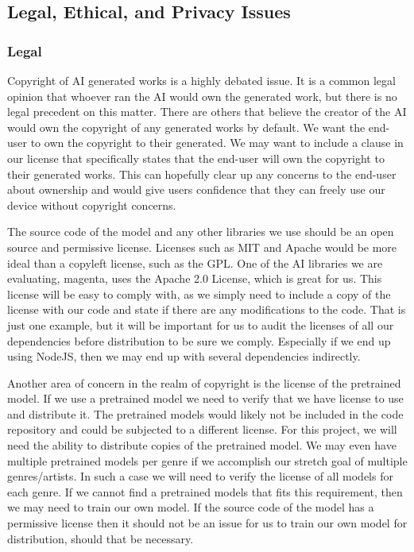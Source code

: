 \subsection{Legal, Ethical, and Privacy Issues}

\subsubsection{Legal}

Copyright of AI generated works is a highly debated issue. It is a common legal opinion
that whoever ran the AI would own the generated work, but there is no legal precedent on
this matter. There are others that believe the creator of the AI would own the copyright
of any generated works by default. We want the end-user to own the copyright to their
generated. We may want to include a clause in our license that specifically states that
the end-user will own the copyright to their generated works. This can hopefully clear up
any concerns to the end-user about ownership and would give users confidence that they can
freely use our device without copyright concerns.

The source code of the model and any other libraries we use should be an open source and
permissive license. Licenses such as MIT and Apache would be more ideal than a copyleft
license, such as the GPL. One of the AI libraries we are evaluating, magenta, uses the
Apache 2.0 License, which is great for us. This license will be easy to comply with, as we
simply need to include a copy of the license with our code and state if there are any
modifications to the code.  That is just one example, but it will be important for us to
audit the licenses of all our dependencies before distribution to be sure we comply.
Especially if we end up using NodeJS, then we may end up with several dependencies
indirectly.

Another area of concern in the realm of copyright is the license of the pretrained model.
If we use a pretrained model we need to verify that we have license to use and distribute
it. The pretrained models would likely not be included in the code repository and could be
subjected to a different license. For this project, we will need the ability to distribute
copies of the pretrained model. We may even have multiple pretrained models per genre if
we accomplish our stretch goal of multiple genres/artists. In such a case we will need to
verify the license of all models for each genre. If we cannot find a pretrained models
that fits this requirement, then we may need to train our own model. If the source code of
the model has a permissive license then it should not be an issue for us to train our own
model for distribution, should that be necessary.

